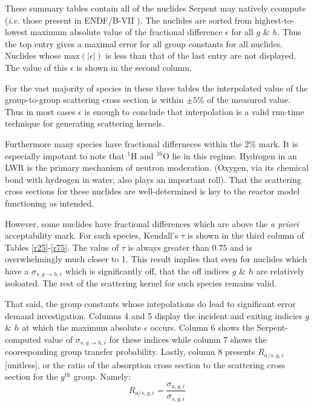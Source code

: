 \documentclass{physor2012}
\newcommand{\superscript}[1]{\ensuremath{^{\textrm{#1}}}}
\newcommand{\nuc}[2]{\superscript{#2}{#1}}
\begin{document}
These summary tables contain all of the nuclides Serpent may natively ccompute
(\emph{i.e.} those present in ENDF/B-VII \cite{}).  The nuclides are sorted from
highest-to-lowest maximum absolute value of the fractional difference $\epsilon$
for all $g$ \& $h$.  Thus the top entry gives a maximal error for all group
constants for all nuclides.  Nuclides whose $\mbox{max}(|\epsilon|)$ is less than 
that of the last entry are not displayed.  The value of this $\epsilon$ is 
shown in the second column.

For the vast majority of species in these three tables the interpolated value of 
the group-to-group scattering cross section is within $\pm 5\%$ of the measured 
value.  Thus in most cases $\epsilon$ is enough to conclude that interpolation 
is a valid run-time technique for generating scattering kernels.

Furthermore many species have fractional differneces within the 2\% mark. 
It is especially impotant to note that \nuc{H}{1} and \nuc{O}{16} lie in 
this regime.  Hydrogen in an LWR is the primary mechanism of neutron 
moderation.  (Oxygen, via its chemical bond with hydrogen in water, also 
plays an important roll).  That the scattering cross sections for these nuclides
are well-determined is key to the reactor model functioning as intended.

However, some nuclides have fractional differences which are above the
\emph{a priori} acceptability mark.  For such species, Kendall's $\tau$ is
shown in the third column of Tables \ref{r25}-\ref{r75}.  The value of
$\tau$ is always greater than $0.75$ and is overwhelmingly much closer to 1.
This result implies that even for nuclides which have a $\sigma_{s,g\to h,i}$ which
is significantly off, that the off indices $g$ \& $h$ are relatively isoloated.  
The rest of the scattering kernel for such species remains valid.

That said, the group constants whose intepolations do lead to significant error
demand investigation.  Columns 4 and 5 display the incident and exiting indicies 
$g$ \& $h$ at which the maximum absolute $\epsilon$ occurs.  Column 6 shows
the Serpent-computed value of $\sigma_{s,g\to h,i}$ for these indices while column 7
shows the cooresponding group transfer probability.  Lastly, column 8 presents 
$R_{a/s,g,i}$ [unitless], or the ratio of the absorption cross section to the 
scattering cross section for the $g$\superscript{th} group.  Namely:
\begin{equation}
\label{R_as}
R_{a/s,g,i} = \frac{\sigma_{a,g,i}}{\sigma_{s,g,i}}
\end{equation}
\end{document}
